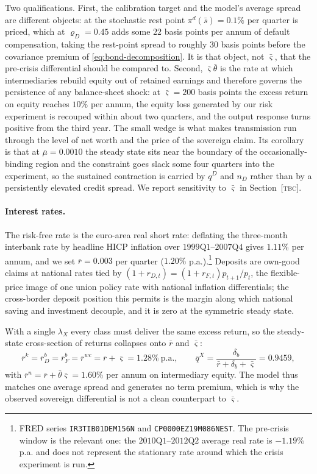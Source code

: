 Two qualifications. First, the calibration target and the model's average spread
are different objects: at the stochastic rest point $\pi^{d}(\bar s)=0.1\%$ per
quarter is priced, which at $\varrho_D=0.45$ adds some $22$ basis points per
annum of default compensation, taking the rest-point spread to roughly $30$ basis
points before the covariance premium of \eqref{eq:bond-decomposition}. It is that
object, not $\bar\varsigma$, that the pre-crisis differential should be compared
to. Second, $\bar\varsigma\bar\theta$ is the rate at which intermediaries rebuild
equity out of retained earnings and therefore governs the persistence of any
balance-sheet shock: at $\bar\varsigma=200$ basis points the excess return on
equity reaches $10\%$ per annum, the equity loss generated by our risk experiment
is recouped within about two quarters, and the output response turns positive
from the third year. The small wedge is what makes transmission run through the
level of net worth and the price of the sovereign claim. Its corollary is that at
$\bar\mu=0.0010$ the steady state sits near the boundary of the
occasionally-binding region and the constraint goes slack some four quarters into
the experiment, so the sustained contraction is carried by $q^{D}$ and $n_D$
rather than by a persistently elevated credit spread. We report sensitivity to
$\bar\varsigma$ in Section~[\textsc{tbc}].

\paragraph{Interest rates.}
The risk-free rate is the euro-area real short rate: deflating the three-month
interbank rate by headline HICP inflation over
$1999\text{Q}1$--$2007\text{Q}4$ gives $1.11\%$ per annum, and we set
$\bar r=0.003$ per quarter ($1.20\%$ p.a.).\footnote{FRED series
\texttt{IR3TIB01DEM156N} and \texttt{CP0000EZ19M086NEST}. The pre-crisis window
is the relevant one: the $2010\text{Q}1$--$2012\text{Q}2$ average real rate is
$-1.19\%$ p.a. and does not represent the stationary rate around which the crisis
experiment is run.} Deposits are own-good claims at national rates tied by
$(1+r_{D,t})=(1+r_{F,t})p_{t+1}/p_t$, the flexible-price image of one union
policy rate with national inflation differentials; the cross-border deposit
position this permits is the margin along which national saving and investment
decouple, and it is zero at the symmetric steady state.

With a single $\lambda_X$ every class must deliver the same excess return, so the
steady-state cross-section of returns collapses onto $\bar r$ and
$\bar\varsigma$:
\begin{equation}
\bar r^{k}=\bar r^{b}_{D}=\bar r^{b}_{F}=\bar r^{wc}=\bar r+\bar\varsigma
=1.28\%\ \text{p.a.},
\qquad
\bar q^{X}=\frac{\delta_b}{\bar r+\delta_b+\bar\varsigma}=0.9459 ,
\label{eq:rate-structure}
\end{equation}
with $\bar r^{n}=\bar r+\bar\theta\bar\varsigma=1.60\%$ per annum on
intermediary equity. The model thus matches one average spread and generates no
term premium, which is why the observed sovereign differential is not a clean
counterpart to $\bar\varsigma$.

